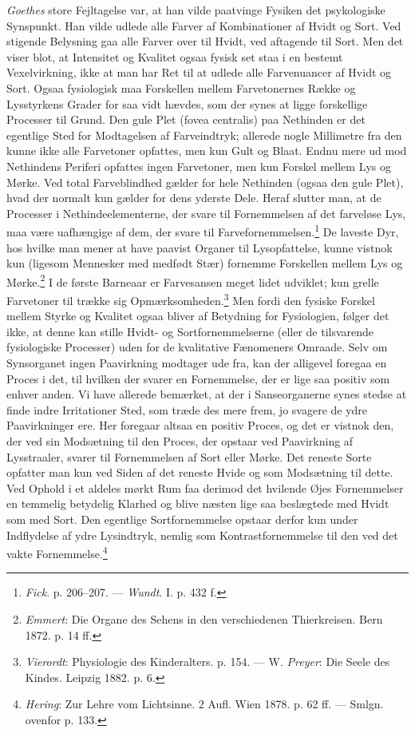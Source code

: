 \documentclass[12pt,a4paper,openany]{book}
\newcommand{\opage}[1]{\marginnote{\footnotesize\textit{[#1]}}}
\begin{document}
\emph{Goethes} store Fejltagelse var, at han vilde paatvinge Fysiken det
psykologiske Synspunkt. Han vilde udlede alle Farver af Kombinationer af
Hvidt og Sort. Ved stigende Belysning gaa alle Farver over til Hvidt,
ved aftagende til Sort. Men det viser blot, at Intensitet og Kvalitet
ogsaa fysisk set staa i en bestemt Vexelvirkning, ikke at man har Ret
til at udlede alle Farvenuancer af Hvidt og Sort. Ogsaa fysiologisk maa
Forskellen mellem Farvetonernes Række og Lysstyrkens Grader for saa vidt
hævdes, som der synes at ligge forskellige Processer til Grund. Den gule
Plet (fovea centralis) paa Nethinden er det egentlige Sted for
Modtagelsen af Farveindtryk; allerede nogle Millimetre fra den kunne
ikke alle Farvetoner opfattes, men kun Gult og Blaat. Endnu mere ud mod
Nethindens Periferi opfattes ingen Farvetoner, men kun Forskel mellem
Lys og Mørke. Ved total Farveblindhed gælder for hele Nethinden (ogsaa
den gule Plet), hvad der normalt kun gælder for dens yderste Dele. Heraf
slutter man, at de Processer i Nethindeelementerne, der svare til
Fornemmelsen af det farveløse Lys, maa være uafhængige af dem, der svare
til Farvefornemmelsen.\footnote[1]{\emph{Fick}. p. 206--207. ---
\emph{Wundt}. I. p. 432 f.} De laveste Dyr, hos hvilke man mener at have
paavist Organer til Lysopfattelse, kunne vistnok kun (ligesom Mennesker
med medfødt Stær) fornemme Forskellen mellem Lys og
Mørke.\footnote[2]{\emph{Emmert}: Die Organe des Sehens in den
verschiedenen Thierkreisen. Bern 1872. p. 14 ff.} I de første Barneaar
er Farvesansen meget lidet udviklet; kun grelle Farvetoner til%
\opage{137}trække sig Opmærksomheden.\footnote[1]{\emph{Vierordt}:
Physiologie des Kinderalters. p. 154. --- W. \emph{Preyer}: Die Seele
des Kindes. Leipzig 1882. p. 6.} Men fordi den fysiske Forskel mellem
Styrke og Kvalitet ogsaa bliver af Betydning for Fysiologien, følger det
ikke, at denne kan stille Hvidt- og Sortfornemmelserne (eller de
tilsvarende fysiologiske Processer) uden for de kvalitative Fænomeners
Omraade. Selv om Synsorganet ingen Paavirkning modtager ude fra, kan der
alligevel foregaa en Proces i det, til hvilken der svarer en
Fornemmelse, der er lige saa positiv som enhver anden. Vi have allerede
bemærket, at der i Sanseorganerne synes stedse at finde indre
Irritationer Sted, som træde des mere frem, jo svagere de ydre
Paavirkninger ere. Her foregaar altsaa en positiv Proces, og det er
vistnok den, der ved sin Modsætning til den Proces, der opstaar ved
Paavirkning af Lysstraaler, svarer til Fornemmelsen af Sort eller Mørke.
Det reneste Sorte opfatter man kun ved Siden af det reneste Hvide og som
Modsætning til dette. Ved Ophold i et aldeles mørkt Rum faa derimod det
hvilende Øjes Fornemmelser en temmelig betydelig Klarhed og blive næsten
lige saa beslægtede med Hvidt som med Sort. Den egentlige
Sortfornemmelse opstaar derfor kun under Indflydelse af ydre Lysindtryk,
nemlig som Kontrastfornemmelse til den ved det vakte
Fornemmelse.\footnote[2]{\emph{Hering}: Zur Lehre vom Lichtsinne. 2
Aufl. Wien 1878. p. 62 ff. --- Smlgn. ovenfor p. 133.}
\end{document}
